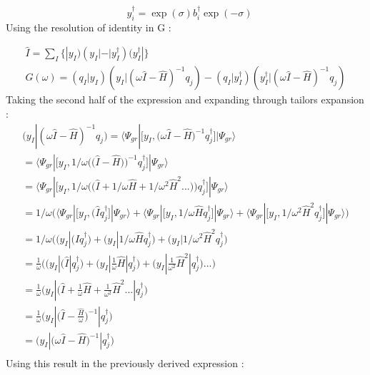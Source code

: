 \documentclass[11pt, oneside]{article}   	%
\begin{document}
\begin{equation*}\label{eq:unitary transformed excitation}
  \begin{aligned}
  \end{aligned}
    y_i^\dagger=\exp(\sigma) b_i^\dagger \exp(- \sigma)
\end{equation*}
Using the resolution of identity in G :

\begin{equation*}\label{eq:resolution of identity}
  \begin{aligned}
    \hat I=\sum_I \{ |y_I)(y_I|-|y_I^\dagger)(y_I^\dagger|\}\\
    G(\omega)=(q_I|y_I)(y_I|(\omega \hat I - \hat H)^{-1}q_j) - (q_I|y_I^\dagger)(y_I^\dagger|(\omega \hat I - \hat H)^{-1}q_j)
  \end{aligned}
\end{equation*}
Taking the second half of the expression and expanding through tailors expansion :
\begin{equation*}\label{eq:resolution of identity}
  \begin{aligned}
    (y_I|(\omega \hat I - \hat H)^{-1}q_j) =\big \langle \Psi_{gr} |\big[ y_I , \big(\omega \hat I-\hat H \big)^{-1} q_j^\dagger \big] | \Psi_{gr}\big \rangle \\ 
     =\big \langle \Psi_{gr} |\big[ y_I , 1 / \omega \Bigg( \big( \hat I-\hat H \big)\Bigg)^{-1} q_j^\dagger \big] | \Psi_{gr}\big \rangle \\ 
     =\big \langle \Psi_{gr} |\big[ y_I , 1 / \omega \Bigg( \big( \hat I+ 1 / \omega \hat H + 1/ \omega^2\hat H^2 ...\big)\Bigg) q_j^\dagger \big] | \Psi_{gr}\big \rangle \\ 
     =1/\omega \Bigg(\big \langle \Psi_{gr} |\big[ y_I , \big( \hat I q_j^\dagger \big] | \Psi_{gr}\big \rangle +\big \langle \Psi_{gr} |\big[ y_I , 1/\omega\hat H  q_j^\dagger \big] | \Psi_{gr}\big \rangle  +\big \langle \Psi_{gr} |\big[ y_I ,1/\omega^2 \hat H^2  q_j^\dagger \big] | \Psi_{gr}\big \rangle \Bigg)\\ 
     =1/\omega \Bigg(\big( y_I | \big( \hat I q_j^\dagger \big) +\big( y_I | 1/\omega\hat H  q_j^\dagger \big) +\big( y_I |1/\omega^2 \hat H^2  q_j^\dagger \big)\\ 
     =\frac{1}{\omega} \Bigg(\big( y_I | \big( \hat I| q_j^\dagger \big) +\big( y_I | \frac{1}{\omega}\hat H | q_j^\dagger \big) +\big( y_I |\frac{1}{\omega^2} \hat H^2|  q_j^\dagger \big)...\Bigg)\\ 
     =\frac{1}{\omega} \big( y_I | \big( \hat I + \frac{1}{\omega}\hat H + \frac{1}{\omega^2} \hat H^2 ...|  q_j^\dagger \big)\\ 
     =\frac{1}{\omega} \big( y_I | \big( \hat I - \frac{\hat H}{\omega}\big)^{-1}|  q_j^\dagger \big)\\ 
     = \big( y_I | \big( \omega\hat I - \hat H\big)^{-1}|  q_j^\dagger \big)\\ 
  \end{aligned}
\end{equation*}
Using this result in the previously derived expression :
\end{document}
